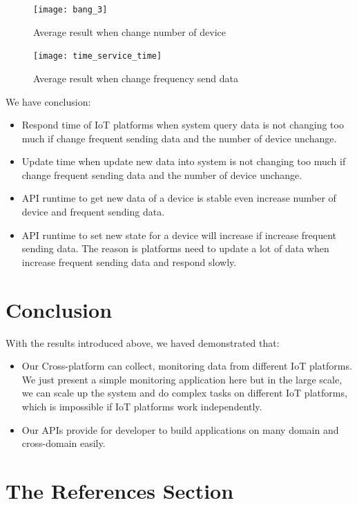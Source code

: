 \documentclass[runningheads,a4paper]{llncs}
\begin{document}
\begin{figure}[H]
\centering
\texttt{[image: bang\_3]} 
\caption{Average result when change number of device}
\end{figure} 




\begin{figure}
\centering
\texttt{[image: time\_service\_time]} 
\caption{Average result when change frequency send data}
\end{figure} 


We have conclusion:

\begin{itemize}
\item Respond time of IoT platforms when system query data is not changing too much if change frequent sending data and the number of device unchange.
\item Update time when update new data into system is not changing too much if change frequent sending data and the number of device unchange.
\item  API runtime to get new data of a device is stable even increase number of device and frequent sending data.
\item API runtime to set new state for a device will increase if increase frequent sending data. The reason is platforms need to update a lot of data when increase frequent sending data and respond slowly.
\end{itemize}


\newpage
\section{Conclusion}

With the results introduced above, we haved demonstrated that:

\begin{itemize}
\item Our Cross-platform can collect, monitoring data from different IoT platforms. We just present a simple monitoring application here but in the large scale, we can scale up the system and do complex tasks on different IoT platforms, which is impossible if IoT platforms work independently.
\item Our APIs provide for developer to build applications on many domain and cross-domain easily.
\end{itemize}

\section{The References Section}\label{references}
\end{document}
